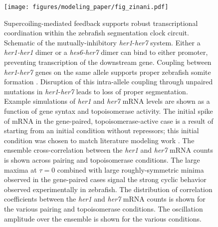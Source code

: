 \documentclass[11pt]{article}
\begin{document}
\begin{figure}[htbp]
    \centering
    {\texttt{[image: figures/modeling\_paper/fig\_zinani.pdf]}
    \label{fig:her1_her7_cartoon}
    \label{fig:zinani_summary_cartoon}
    \label{fig:zinani_mRNA_behavior}
    \label{fig:zinani_cross_correlation}
    \label{fig:zinani_correlation_coeff}
    \label{fig:zinani_oscillation_amplitude}
    }
\end{figure}
\begin{figure}[htbp]
    \ContinuedFloat
    \caption{Supercoiling-mediated feedback supports robust transcriptional coordination within the zebrafish segmentation clock circuit.
         Schematic of the mutually-inhibitory \textit{her1}-\textit{her7} system. Either a \textit{her1-her1} dimer or a \textit{hes6-her7} dimer can bind to either promoter, preventing transcription of the downstream gene.
         Coupling between \textit{her1}-\textit{her7} genes on the same allele supports proper zebrafish somite formation \parencite{zinaniPairingSegmentationClock2021}. Disruption of this intra-allele coupling through unpaired mutations in \textit{her1}-\textit{her7} leads to loss of proper segmentation.
         Example simulations of \textit{her1} and \textit{her7} mRNA levels are shown as a function of gene syntax and topoisomerase activity. The initial spike of mRNA in the gene-paired, topoisomerase-active case is a result of starting from an initial condition without repressors; this initial condition was chosen to match literature modeling work \parencite{zinaniPairingSegmentationClock2021}.
         The ensemble cross-correlation between the \textit{her1} and \textit{her7} mRNA counts is shown across pairing and topoisomerase conditions.  The large maxima at \(\tau = 0\) combined with large roughly-symmetric minima observed in the gene-paired cases signal the strong cyclic behavior observed experimentally in zebrafish.
         The distribution of correlation coefficients between the \textit{her1} and \textit{her7} mRNA counts is shown for the various pairing and topoisomerase conditions. 
         The oscillation amplitude over the ensemble is shown for the various conditions. 
    } \label{fig:top:her1_her7}
\end{figure}
\end{document}
